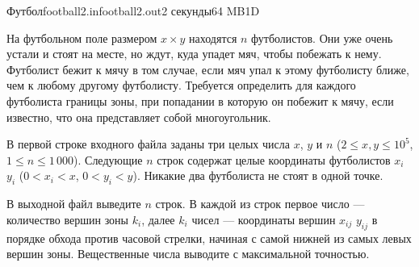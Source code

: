 \begin{problem}{Футбол}{football2.in}{football2.out}{2 секунды}{64 MB}{1D}

На футбольном поле размером
$x\times y$ находятся $n$ футболистов. Они уже очень устали
и стоят на месте, но ждут, куда упадет мяч, чтобы побежать к нему.
Футболист бежит к мячу в том случае, если мяч упал к этому
футболисту ближе, чем к любому другому футболисту. 
Требуется определить для каждого футболиста
границы зоны, при попадании
в которую он побежит к мячу, если известно, что она представляет собой многоугольник.

\InputFile

В первой строке входного файла заданы 
три 
целых числа $x$, $y$ и $n$ ($2\le x,y\le 10^5$, $1\le n\le 1\,000$).
Следующие $n$ строк содержат 
целые координаты футболистов $x_i$ $y_i$ ($0<x_i<x$, $0<y_i<y$). Никакие два
футболиста не стоят в одной точке.

\OutputFile

В выходной файл выведите $n$ строк. В каждой из строк первое число ---
количество вершин зоны $k_i$, далее $k_i$ чисел --- координаты вершин $x_{ij}$ $y_{ij}$
в порядке обхода против часовой стрелки, начиная с самой нижней из самых левых вершин
зоны. Вещественные числа выводите с максимальной точностью.

\Example

\begin{example}
%
\end{example}

\end{problem}